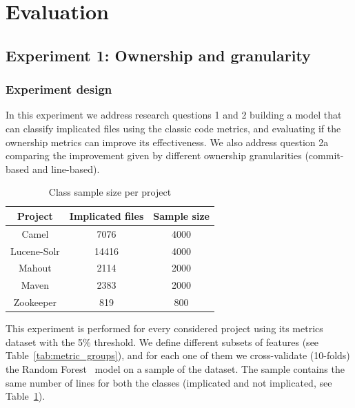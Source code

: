 \section{Evaluation}
\label{sec:evaluation}

\subsection{Experiment 1: Ownership and granularity}

\subsubsection{Experiment design}

In this experiment we address research questions 1 and 2 building a model that can classify implicated files using the classic code metrics, and evaluating if the ownership metrics can improve its effectiveness. We also address question 2a comparing the improvement given by different ownership granularities (commit-based and line-based).

\begin{table}[ht]
    \footnotesize
    \centering
    \caption{Class sample size per project}
    \label{tab:sample_size}
    \begin{tabular}{|c|c|c|}
        \hline
        \textbf{Project} & \textbf{Implicated files} & \textbf{Sample size} \\
        \hline
        Camel & 7076 & 4000 \\
        Lucene-Solr & 14416 & 4000 \\
        Mahout & 2114 & 2000 \\
        Maven  & 2383 & 2000 \\
        Zookeeper & 819 & 800 \\
        \hline
    \end{tabular}
\end{table}

This experiment is performed for every considered project using its metrics dataset with the 5\% threshold. We define different subsets of features (see Table~\ref{tab:metric_groups}), and for each one of them we cross-validate (10-folds) the Random Forest~\cite{breiman2001random} model on a sample of the dataset. The sample contains the same number of lines for both the classes (implicated and not implicated, see Table~\ref{tab:sample_size}).


